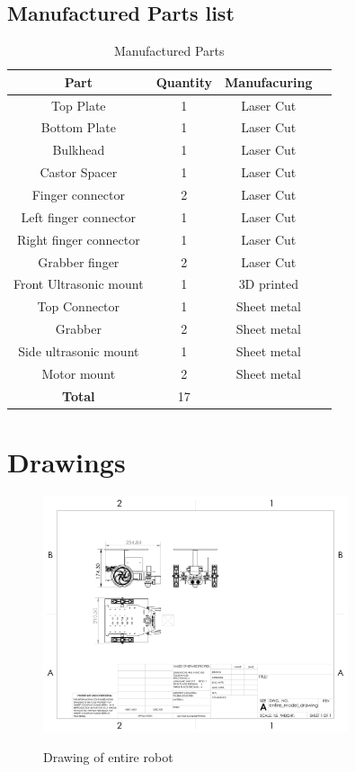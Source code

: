 \documentclass{article}
\begin{document}
\subsection{Manufactured Parts list}
\begin{table}[h]
    \centering
    \begin{tabular}{|c|c|c|c|}
        \hline
        \textbf{Part} & \textbf{Quantity} & \textbf{Manufacuring} \\ \hline
        \hline
        Top Plate & 1 & Laser Cut \\
        \hline
        Bottom Plate & 1 & Laser Cut \\
        \hline
        Bulkhead & 1 & Laser Cut \\
        \hline
        Castor Spacer & 1 & Laser Cut \\
        \hline
        Finger connector & 2 & Laser Cut \\
        \hline
        Left finger connector & 1 & Laser Cut \\
        \hline
        Right finger connector & 1 & Laser Cut \\
        \hline
        Grabber finger & 2 & Laser Cut \\
        \hline
        Front Ultrasonic mount & 1 & 3D printed \\
        \hline
        Top Connector & 1 & Sheet metal \\
        \hline
        Grabber & 2 & Sheet metal \\
        \hline
        Side ultrasonic mount & 1 & Sheet metal \\
        \hline
        Motor mount & 2 & Sheet metal \\
        \hline
        \textbf{Total} & 17 & \\ \hline
    \end{tabular}
    \caption{Manufactured Parts}
    \label{tab:manufactured_parts}
\end{table}

\section{Drawings}

\begin{figure}[H]
    \centering
    \includegraphics[width=0.8\textwidth]{assets/entire_model_drawing.JPG}
    \label{fig:entire_model_drawing}
    \caption{Drawing of entire robot}
\end{figure}
\end{document}
